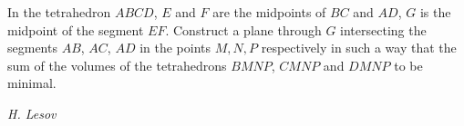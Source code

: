 In the tetrahedron $ABCD$, $E$ and $F$ are the midpoints of $BC$ and $AD$, $G$ is the midpoint of the segment $EF$. Construct a plane through $G$ intersecting the segments $AB$, $AC$, $AD$ in the points $M,N,P$ respectively in such a way that the sum of the volumes of the tetrahedrons $BMNP$, $CMNP$ and $DMNP$ to be minimal.

\textit{H. Lesov}